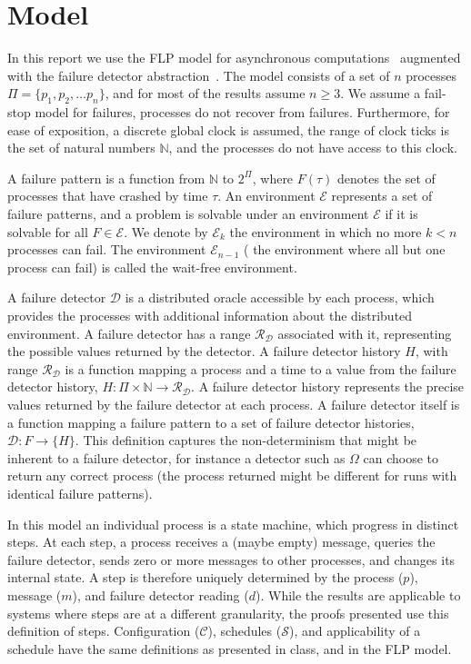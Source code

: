 \section{Model}
In this report we use the FLP model for asynchronous computations~\cite{fischer1985impossibility} augmented with the
failure detector abstraction~\cite{chandra1996unreliable, chandra1996weakest}. The model consists of a set of $n$
processes $\Pi = \{p_1, p_2, \ldots p_n\}$, and for most of the results assume $n \geq 3$. We assume a fail-stop model
for failures, \ie processes do not recover from failures. Furthermore, for ease of exposition, a discrete global clock is assumed, the range of
clock ticks is the set of natural numbers $\mathbb{N}$, and the processes do not have access to this clock.

A failure pattern is a function from $\mathbb{N}$ to $2^{\Pi}$, where $F(\tau)$ denotes the set of processes that have
crashed by time $\tau$. An environment $\mathcal{E}$ represents a set of failure patterns, and a problem is solvable
under an environment $\mathcal{E}$ if it is solvable for all $F \in \mathcal{E}$. We denote by
$\mathcal{E}_k$ the environment in which no more $k < n$ processes can fail. The environment $\mathcal{E}_{n - 1}$ (\ie
the environment where all but one process can fail) is called the wait-free environment.

A failure detector $\mathcal{D}$ is a distributed oracle accessible by each process, which provides the
processes with additional information about the distributed environment. A failure detector has a range
$\mathcal{R}_{\mathcal{D}}$ associated with it, representing the possible values returned by the detector. A
failure detector history $H$, with range $\mathcal{R}_{\mathcal{D}}$ is a function mapping a process and a time to a value from the failure detector history,
\ie $H : \Pi \times \mathbb{N} \rightarrow \mathcal{R}_{\mathcal{D}}$. A failure detector history represents the precise
values returned by the failure detector at each process. A failure detector itself is a function mapping a failure
pattern to a set of failure detector histories, \ie $\mathcal{D}: F \rightarrow \{H\}$. This definition captures the
non-determinism that might be inherent to a failure detector, for instance a detector such as $\Omega$ can choose to
return any correct process (the process returned might be different for runs with identical failure
patterns).

In this model an individual process is a state machine, which progress in distinct steps. At each step, a process
receives a (maybe empty) message, queries the failure detector, sends zero or more messages to other processes, and
changes its internal state. A step is therefore uniquely determined by the process ($p$), message ($m$), and failure
detector reading ($d$). While the results are applicable to systems where steps are at a different granularity, the
proofs presented use this definition of steps. Configuration ($\mathcal{C}$), schedules ($\mathcal{S}$), and
applicability of a schedule have the same definitions as presented in class, and in the FLP model.

